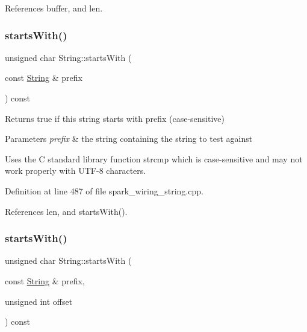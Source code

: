 References buffer, and len.

\mbox{\label{class_string_aa63267cdf821b619ffb0a103510ae6ff}} 
\subsubsection{\texorpdfstring{starts\+With()}{startsWith()}\hspace{0.1cm}{\footnotesize\ttfamily [1/2]}}
{\footnotesize\ttfamily unsigned char String\+::starts\+With (\begin{DoxyParamCaption}\item[{const \hyperlink{class_string}{String} \&}]{prefix }\end{DoxyParamCaption}) const}



Returns true if this string starts with prefix (case-\/sensitive) 


\begin{DoxyParams}{Parameters}
{\em prefix} & the string containing the string to test against\\
\hline
\end{DoxyParams}
Uses the C standard library function strcmp which is case-\/sensitive and may not work properly with U\+T\+F-\/8 characters. 

Definition at line 487 of file spark\+\_\+wiring\+\_\+string.\+cpp.



References len, and starts\+With().

\mbox{\label{class_string_a2ea4d98b45263f59c9eb1f842b04b3af}} 
\subsubsection{\texorpdfstring{starts\+With()}{startsWith()}\hspace{0.1cm}{\footnotesize\ttfamily [2/2]}}
{\footnotesize\ttfamily unsigned char String\+::starts\+With (\begin{DoxyParamCaption}\item[{const \hyperlink{class_string}{String} \&}]{prefix,  }\item[{unsigned int}]{offset }\end{DoxyParamCaption}) const}



